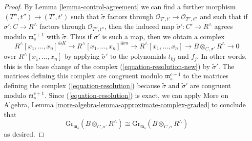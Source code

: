 \documentclass[10pt,a4paper]{amsart}
\theoremstyle{plain}
\theoremstyle{definition}
\theoremstyle{remark}
\numberwithin{equation}{subsection}
\begin{document}
\begin{proof}
\medskip\noindent
By Lemma \ref{lemma-control-agreement}
we can find a further morphism $(T'', t'') \to (T', t')$
such that $\tilde\sigma$
factors through $\mathcal{O}_{T', t'} \to \mathcal{O}_{T'', t''}$
and such that if $\sigma' : C \to R^\wedge$
factors through $\mathcal{O}_{T'', t''}$, then the induced map
$\tilde \sigma' : C' \to R^\wedge$
agrees modulo $\mathfrak m_s^{c + 1}$ with $\tilde \sigma$.
Thus if $\sigma'$ is such a map, then we obtain a complex
$$
R^\wedge[x_1, \ldots, x_n]^{\oplus K} \to
R^\wedge[x_1, \ldots, x_n]^{\oplus m} \to
R^\wedge[x_1, \ldots, x_n] \to B \otimes_{C, \sigma'} R^\wedge \to 0
$$
over $R^\wedge[x_1, \ldots, x_n]$ by applying $\tilde\sigma'$
to the polynomials $t_{kj}$ and $f_j$. In other words, this
is the base change of the complex (\ref{equation-resolution-new})
by $\tilde\sigma'$. The matrices defining this complex
are congruent modulo $\mathfrak m_s^{c + 1}$ to the matrices
defining the complex (\ref{equation-resolution}) because
$\tilde \sigma$ and $\tilde \sigma'$ are congruent modulo
$\mathfrak m_s^{c + 1}$. Since (\ref{equation-resolution}) is exact,
we can apply
More on Algebra, Lemma \ref{more-algebra-lemma-approximate-complex-graded}
to conclude that
$$
\text{Gr}_{\mathfrak m_s}(B \otimes_{C, \sigma'} R^\wedge)
\cong
\text{Gr}_{\mathfrak m_s}(B \otimes_{C, \sigma} R^\wedge)
$$
as desired.
\end{proof}
\end{document}
